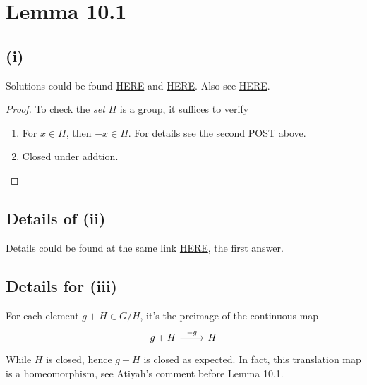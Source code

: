 \section{Lemma 10.1}

\subsection{(i)}
Solutions could be found \href{https://math.stackexchange.com/questions/13368/intersection-of-neighborhoods-of-0-subgroup}{HERE} and \href{https://math.stackexchange.com/questions/174955/intersection-of-all-neighborhoods-of-zero-is-a-subgroup}{HERE}. 
Also see \href{http://www.math.brown.edu/dabramov/MA/s1617/252/MA252Ch10.pdf}{HERE}.

\begin{proof}
	To check the \textit{set} $H$ is a group, it suffices to verify 
	\begin{enumerate}
		\item For $x\in H$, then $-x\in H$. For details see the second \href{https://math.stackexchange.com/questions/174955/intersection-of-all-neighborhoods-of-zero-is-a-subgroup}{POST} above.
		\item Closed under addtion.
	\end{enumerate}

\end{proof}

\subsection{Details of (ii)}
Details could be found at the same link \href{https://math.stackexchange.com/questions/174955/intersection-of-all-neighborhoods-of-zero-is-a-subgroup}{HERE}, the first answer.

\subsection{Details for (iii)}
For each element $g+H\in G/H$, it's the preimage of the continuous map
\[\begin{tikzcd}
	{g+H} & H
	\arrow["{-g}", from=1-1, to=1-2]
\end{tikzcd}\] While $H$ is closed, hence $g+H$ is closed as expected. In fact, this translation map is a homeomorphism, see Atiyah's comment before Lemma 10.1.

